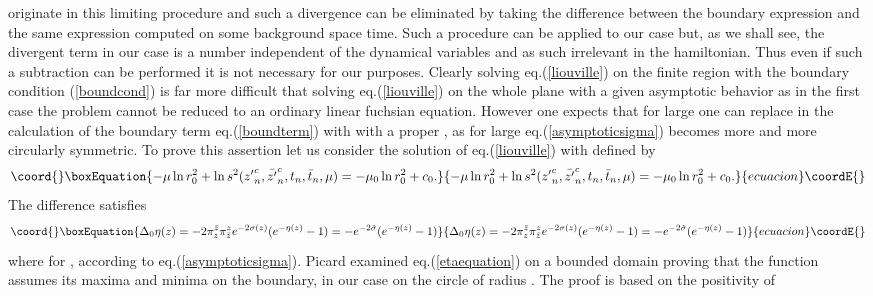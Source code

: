\documentclass[a4paper,12pt]{article}
\begin{document}
originate in this limiting procedure and such a divergence can be
eliminated by taking the difference between the boundary expression
and the same expression computed on some background space time. Such a
procedure can be applied to our case but, as we shall see, the divergent
term in our case is a number independent of the dynamical variables
and as such irrelevant in the hamiltonian. Thus even if such a
subtraction can be performed it is not necessary for our purposes.
Clearly solving eq.(\ref{liouville}) on the finite region \coordHE{} with the boundary condition (\ref{boundcond}) is far more
difficult that solving 
eq.(\ref{liouville}) on the whole plane with a given asymptotic
behavior \coordHE{} as in the first case the
problem cannot be reduced to an ordinary linear fuchsian
equation. However one expects that for large \coordHE{} one can replace in
the calculation of the boundary term eq.(\ref{boundterm})
\coordHE{} with \myHighlight{$\sigma$}\coordHE{} with a proper \myHighlight{$\mu$}\coordHE{}, as for large \coordHE{}
eq.(\ref{asymptoticsigma}) becomes more and more circularly symmetric. To
prove this assertion
let us consider the solution of eq.(\ref{liouville}) \coordHE{}
with \myHighlight{$\mu$}\coordHE{} defined by
\begin{equation}\coord{}\boxEquation{\label{mumu0}
-\mu\ln r^2_0 +\ln s^2({z'}^c_n, \bar {z'}^c_n,t_n,\bar t_n,\mu) 
= -\mu_0\ln r_0^2+c_0. 
}{-\mu\ln r^2_0 +\ln s^2({z'}^c_n, \bar {z'}^c_n,t_n,\bar t_n,\mu) 
= -\mu_0\ln r_0^2+c_0. 
}{ecuacion}\coordE{}\end{equation}
The difference \coordHE{} satisfies  
\begin{equation}\coord{}\boxEquation{\label{etaequation}
\Delta_0\eta(z) = -2 \pi^{\bar z}_z \pi^{z}_{\bar z}
e^{-2\sigma(z)}(e^{-\eta(z)}-1) = - e^{-2\tilde\sigma}(e^{-\eta(z)}-1)
}{\Delta_0\eta(z) = -2 \pi^{\bar z}_z \pi^{z}_{\bar z}
e^{-2\sigma(z)}(e^{-\eta(z)}-1) = - e^{-2\tilde\sigma}(e^{-\eta(z)}-1)
}{ecuacion}\coordE{}\end{equation}
where for \coordHE{}, \coordHE{} according to
eq.(\ref{asymptoticsigma}). Picard \cite{picard} examined
eq.(\ref{etaequation}) on a bounded domain proving that the function
\myHighlight{$\eta$}\coordHE{} assumes its maxima and minima on the boundary, in our case on
the circle of radius \coordHE{}. The proof is based on the positivity of
\end{document}
